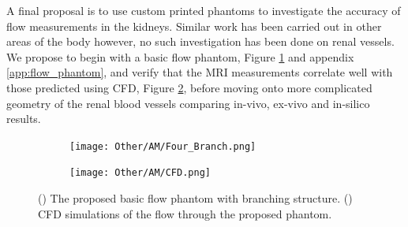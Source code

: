 A final proposal is to use custom printed phantoms to investigate the accuracy of flow measurements in the kidneys. Similar work has been carried out in other areas of the body \cite{canstein_3d_2008, anderson_validation_2014} however, no such investigation has been done on renal vessels. We propose to begin with a basic flow phantom, Figure \ref{fig:am_flow_render} and appendix \ref{app:flow_phantom}, and verify that the \ac{MRI} measurements correlate well with those predicted using \ac{CFD}, Figure \ref{fig:am_flow_cfd}, before moving onto more complicated geometry of the renal blood vessels comparing in-vivo, ex-vivo and in-silico results.

\begin{figure}[H]
	\centering
	\begin{subfigure}[c]{0.47\textwidth}
		\centering
		\texttt{[image: Other/AM/Four\_Branch.png]}
		\caption{}
		\label{fig:am_flow_render}
	\end{subfigure}
	\hfill
	\begin{subfigure}[c]{0.47\textwidth}
		\centering
		\texttt{[image: Other/AM/CFD.png]}
		\caption{}
		\label{fig:am_flow_cfd}
	\end{subfigure}
	\caption{() The proposed basic flow phantom with branching structure. () \ac{CFD} simulations of the flow through the proposed phantom.}
	\label{fig:am_flow}
\end{figure}
